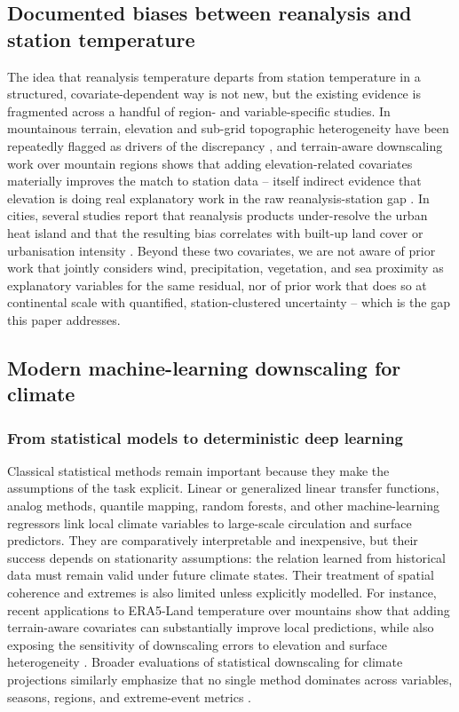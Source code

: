 \documentclass[a4paper,12pt,leqno]{article}
\begin{document}
\subsection{Documented biases between reanalysis and station temperature}
\label{sec:related-bias}

The idea that reanalysis temperature departs from station temperature in
a structured, covariate-dependent way is not new, but the existing
evidence is fragmented across a handful of region- and variable-specific
studies. In mountainous terrain, elevation and sub-grid topographic
heterogeneity have been repeatedly flagged as drivers of the discrepancy
\parencite{satyapragyan2026bias}, and terrain-aware downscaling work over
mountain regions shows that adding elevation-related covariates
materially improves the match to station data -- itself indirect evidence
that elevation is doing real explanatory work in the raw
reanalysis-station gap \parencite{sebbar2023ml_downscaling}. In cities,
several studies report that reanalysis products under-resolve the urban
heat island and that the resulting bias correlates with built-up land
cover or urbanisation intensity
\parencite{jacobs2024filling,nogueira2022assessment,zou2022performance}.
Beyond these two covariates, we are not aware of prior work that jointly
considers wind, precipitation, vegetation, and sea proximity as
explanatory variables for the same residual, nor of prior work that does
so at continental scale with quantified, station-clustered uncertainty --
which is the gap this paper addresses.

\subsection{Modern machine-learning downscaling for climate}
\label{sec:related-ml}

\subsubsection{From statistical models to deterministic deep learning}

Classical statistical methods remain important because they make the
assumptions of the task explicit. Linear or generalized linear transfer
functions, analog methods, quantile mapping, random forests, and other
machine-learning regressors link local climate variables to large-scale
circulation and surface predictors. They are comparatively interpretable
and inexpensive, but their success depends on stationarity assumptions:
the relation learned from historical data must remain valid under future
climate states. Their treatment of spatial coherence and extremes is also
limited unless explicitly modelled. For instance, recent applications to
ERA5-Land temperature over mountains show that adding terrain-aware
covariates can substantially improve local predictions, while also
exposing the sensitivity of downscaling errors to elevation and surface
heterogeneity \parencite{sebbar2023ml_downscaling}. Broader evaluations of
statistical downscaling for climate projections similarly emphasize that
no single method dominates across variables, seasons, regions, and
extreme-event metrics
\parencite{hernanz2022statistical_downscaling,tabari2021downscaling_drought}.
\end{document}
